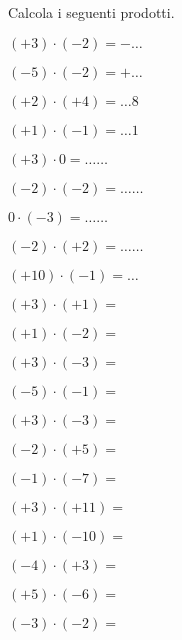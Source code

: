 \begin{esercizio}
 \label{ese:2.16}
Calcola i seguenti prodotti.
\begin{htmulticols}{3}
 \begin{enumeratees}
 \item \((+3)\cdot(-2) =-\ldots\)
 \item \((-5)\cdot(-2)=+\ldots\)
 \item \((+2)\cdot(+4) =\ldots8\)
 \item \((+1)\cdot(-1) =\ldots1\)
 \item \((+3)\cdot0 = \ldots\ldots\)
 \item \((-2)\cdot(-2) =\ldots\ldots\)
 \item \(0\cdot(-3) = \ldots\ldots\)
 \item \((-2)\cdot(+2) =\ldots\ldots\)
 \item \((+10)\cdot(-1) =\ldots\)
 \item \((+3)\cdot(+1) =\)
 \item \((+1)\cdot(-2) =\)
 \item \((+3)\cdot(-3) =\)
 \item \((-5)\cdot(-1) =\)
 \item \((+3)\cdot(-3) =\)
 \item \((-2)\cdot(+5) =\)
 \item \((-1)\cdot(-7) =\)
 \item \((+3)\cdot(+11) =\)
 \item \((+1)\cdot(-10) =\)
 \item \((-4)\cdot(+3) =\)
 \item \((+5)\cdot(-6) =\)
 \item \((-3)\cdot(-2) =\)
 \end{enumeratees}
\end{htmulticols}
\end{esercizio}

